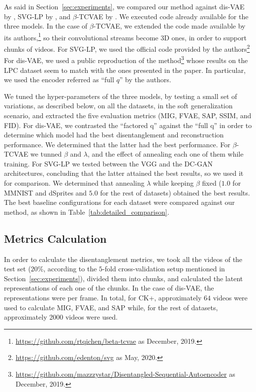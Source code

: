 As said in Section~\ref{sec:experiments}, we compared our method against dis-VAE by \textcite{Li2018}, SVG-LP by \textcite{Denton2018}, and $\beta$-TCVAE by \textcite{Chen2018dr}.
We executed code already available for the three models. 
In the case of $\beta$-TCVAE, we extended the code made available by its authors,\footnote{\url{https://github.com/rtqichen/beta-tcvae} as  December, 2019.} so their convolutional streams become 3D ones, in order to support chunks of videos. 
For SVG-LP, we used the official code provided by the authors\footnote{\url{https://github.com/edenton/svg} as  May, 2020.}
For dis-VAE, we used a public reproduction of the method\footnote{\url{https://github.com/mazzzystar/Disentangled-Sequential-Autoencoder} as  December, 2019.}
whose results on the LPC dataset seem to match with the ones presented in the paper. 
In particular, we used the encoder referred as ``full $q$'' by the authors.

We tuned the hyper-parameters of the three models, by testing a small set of variations, as described below, on all the datasets, in the soft generalization scenario, and extracted the five evaluation metrics (MIG, FVAE, SAP, SSIM, and FID).
For dis-VAE, we contrasted the ``factored q'' against the ``full q'' in order to determine which model had the best disentanglement and reconstruction performance.
We determined that the latter had the best performance.
For $\beta$-TCVAE we tunned $\beta$ and $\lambda$, and the effect of annealing each one of them while training.
For SVG-LP we tested between the VGG and the DC-GAN architectures, concluding that the latter attained the best results, so we used it for comparison.
We determined that annealing $\lambda$ while keeping $\beta$ fixed ($1.0$ for MMNIST and dSprites and $5.0$ for the rest of datasets) obtained the best results.
The best baseline configurations for each dataset were compared against our method, as shown in Table~\ref{tab:detailed_comparison}.

\subsection{Metrics Calculation}

In order to calculate the disentanglement metrics, we took all the videos of the test set ($20\%$, according to the $5$-fold cross-validation setup mentioned in Section~\ref{sec:experiments}), divided them into chunks, and calculated the latent representations of each one of the chunks.
In the case of dis-VAE, the representations were per frame.
In total, for CK+, approximately $64$ videos were used to calculate MIG, FVAE, and SAP while, for the rest of datasets, approximately \num{2000} videos were used.

